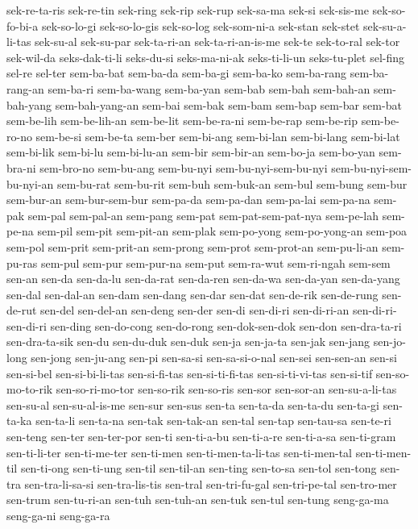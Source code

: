{sek-re-ta-ris sek-re-tin sek-ring sek-rip sek-rup sek-sa-ma sek-si
sek-sis-me sek-so-fo-bi-a sek-so-lo-gi sek-so-lo-gis sek-so-log
sek-som-ni-a sek-stan sek-stet sek-su-a-li-tas sek-su-al sek-su-par
sek-ta-ri-an sek-ta-ri-an-is-me sek-te sek-to-ral sek-tor sek-wil-da
seks-dak-ti-li seks-du-si seks-ma-ni-ak seks-ti-li-un seks-tu-plet
sel-fing sel-re sel-ter sem-ba-bat sem-ba-da sem-ba-gi sem-ba-ko
sem-ba-rang sem-ba-rang-an sem-ba-ri sem-ba-wang sem-ba-yan sem-bab
sem-bah sem-bah-an sem-bah-yang sem-bah-yang-an sem-bai sem-bak sem-bam
sem-bap sem-bar sem-bat sem-be-lih sem-be-lih-an sem-be-lit sem-be-ra-ni
sem-be-rap sem-be-rip sem-be-ro-no sem-be-si sem-be-ta sem-ber sem-bi-ang
sem-bi-lan sem-bi-lang sem-bi-lat sem-bi-lik sem-bi-lu sem-bi-lu-an
sem-bir sem-bir-an sem-bo-ja sem-bo-yan sem-bra-ni sem-bro-no sem-bu-ang
sem-bu-nyi sem-bu-nyi-sem-bu-nyi sem-bu-nyi-sem-bu-nyi-an sem-bu-rat
sem-bu-rit sem-buh sem-buk-an sem-bul sem-bung sem-bur sem-bur-an
sem-bur-sem-bur sem-pa-da sem-pa-dan sem-pa-lai sem-pa-na sem-pak sem-pal
sem-pal-an sem-pang sem-pat sem-pat-sem-pat-nya sem-pe-lah sem-pe-na
sem-pil sem-pit sem-pit-an sem-plak sem-po-yong sem-po-yong-an sem-poa
sem-pol sem-prit sem-prit-an sem-prong sem-prot sem-prot-an sem-pu-li-an
sem-pu-ras sem-pul sem-pur sem-pur-na sem-put sem-ra-wut sem-ri-ngah
sem-sem sen-an sen-da sen-da-lu sen-da-rat sen-da-ren sen-da-wa sen-da-yan
sen-da-yang sen-dal sen-dal-an sen-dam sen-dang sen-dar sen-dat sen-de-rik
sen-de-rung sen-de-rut sen-del sen-del-an sen-deng sen-der sen-di
sen-di-ri sen-di-ri-an sen-di-ri-sen-di-ri sen-ding sen-do-cong
sen-do-rong sen-dok-sen-dok sen-don sen-dra-ta-ri sen-dra-ta-sik sen-du
sen-du-duk sen-duk sen-ja sen-ja-ta sen-jak sen-jang sen-jo-long sen-jong
sen-ju-ang sen-pi sen-sa-si sen-sa-si-o-nal sen-sei sen-sen-an sen-si
sen-si-bel sen-si-bi-li-tas sen-si-fi-tas sen-si-ti-fi-tas
sen-si-ti-vi-tas sen-si-tif sen-so-mo-to-rik sen-so-ri-mo-tor sen-so-rik
sen-so-ris sen-sor sen-sor-an sen-su-a-li-tas sen-su-al sen-su-al-is-me
sen-sur sen-sus sen-ta sen-ta-da sen-ta-du sen-ta-gi sen-ta-ka sen-ta-li
sen-ta-na sen-tak sen-tak-an sen-tal sen-tap sen-tau-sa sen-te-ri sen-teng
sen-ter sen-ter-por sen-ti sen-ti-a-bu sen-ti-a-re sen-ti-a-sa sen-ti-gram
sen-ti-li-ter sen-ti-me-ter sen-ti-men sen-ti-men-ta-li-tas sen-ti-men-tal
sen-ti-men-til sen-ti-ong sen-ti-ung sen-til sen-til-an sen-ting sen-to-sa
sen-tol sen-tong sen-tra sen-tra-li-sa-si sen-tra-lis-tis sen-tral
sen-tri-fu-gal sen-tri-pe-tal sen-tro-mer sen-trum sen-tu-ri-an sen-tuh
sen-tuh-an sen-tuk sen-tul sen-tung seng-ga-ma seng-ga-ni seng-ga-ra
}
